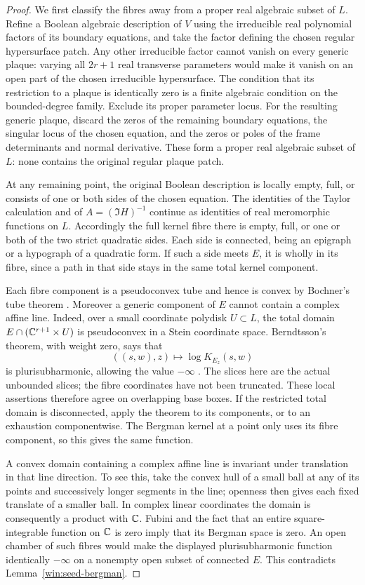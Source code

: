 \begin{proof}
We first classify the fibres away from a proper real algebraic subset
of $L$.  Refine a Boolean algebraic description of $V$ using the
irreducible real polynomial factors of its boundary equations, and
take the factor defining the chosen regular hypersurface patch.
Any other irreducible factor cannot vanish on every generic plaque:
varying all $2r+1$ real transverse parameters would make it vanish on
an open part of the chosen irreducible hypersurface.  The condition
that its restriction to a plaque is identically zero is a finite
algebraic condition on the bounded-degree family.  Exclude its proper
parameter locus.  For the resulting generic plaque, discard the zeros
of the remaining boundary equations, the singular locus of the chosen
equation, and the zeros or poles of the frame determinants and normal
derivative.  These form a proper real algebraic subset of $L$: none
contains the original regular plaque patch.

At any remaining point, the original Boolean description is locally
empty, full, or consists of one or both sides of the chosen equation.
The identities of the Taylor calculation and of $A=(\Im H)^{-1}$
continue as identities of real meromorphic functions on $L$.
Accordingly the full kernel fibre there is empty, full, or one or both
of the two strict quadratic sides.  Each side is connected, being an
epigraph or a hypograph of a quadratic form.  If such a side meets $E$,
it is wholly in its fibre, since a path in that side stays in the same
total kernel component.

Each fibre component is a pseudoconvex tube and hence is convex by
Bochner's tube theorem \cite[Theorem~1.1]{Noguchi2020}.  Moreover a generic component
of $E$ cannot contain a complex affine line.  Indeed, over a small
coordinate polydisk $U\subset L$, the total domain
$E\cap(\mathbb C^{r+1}\times U)$ is pseudoconvex in a Stein coordinate
space.  Berndtsson's theorem, with weight zero, says that
\[
                 ((s,w),z)\longmapsto\log K_{E_z}(s,w)
\]
is plurisubharmonic, allowing the value $-\infty$
\cite[Theorem~1.1]{Berndtsson2006}.  The slices here are the actual
unbounded slices; the fibre coordinates have not been truncated.
These local assertions therefore agree on overlapping base boxes.
If the restricted total domain is disconnected, apply the theorem
to its components, or to an exhaustion componentwise.  The Bergman
kernel at a point only uses its fibre component, so this gives the
same function.

A convex domain containing a complex affine line is invariant under
translation in that line direction.  To see this, take the convex
hull of a small ball at any of its points and successively longer
segments in the line; openness then gives each fixed translate of a
smaller ball.  In complex linear coordinates the domain is consequently
a product with $\mathbb C$.  Fubini and the fact that an entire square-integrable
function on $\mathbb C$ is zero imply that its Bergman space is zero.
An open chamber of such fibres would make the displayed plurisubharmonic
function identically $-\infty$ on a nonempty open subset of connected
$E$.  This contradicts Lemma~\ref{win:seed-bergman}.


\end{proof}
